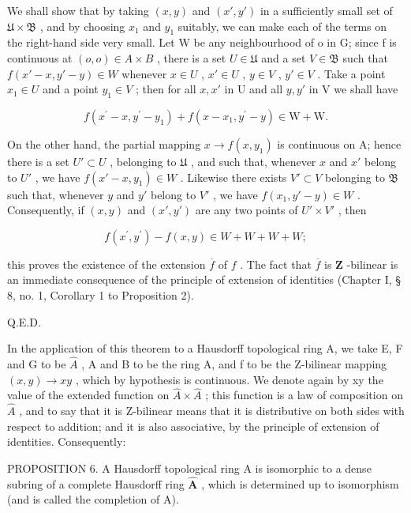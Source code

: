 We shall show that by taking \((x, y)\) and \((x', y')\) in a sufficiently small set of \(\mathfrak{U} \times \mathfrak{B}\) , and by choosing \(x_{1}\) and \(y_{1}\) suitably, we can make each of the terms on the right-hand side very small. Let W be any neighbourhood of o in G; since f is continuous at \((o, o) \in A \times B\) , there is a set \(U \in \mathfrak{U}\) and a set \(V \in \mathfrak{B}\) such that \(f(x' - x, y' - y) \in W\) whenever \(x \in U\) , \(x' \in U\) , \(y \in V\) , \(y' \in V\) . Take a point \(x_{1} \in U\) and a point \(y_{1} \in V\) ; then for all \(x, x'\) in U and all \(y, y'\) in V we shall have

\[
f \left(x ^ {\prime} - x, y ^ {\prime} - y _ {1}\right) + f \left(x - x _ {1}, y ^ {\prime} - y\right) \in \mathrm{W} + \mathrm{W}.
\]

On the other hand, the partial mapping \(x \to f(x, y_1)\) is continuous on A; hence there is a set \(U' \subset U\) , belonging to \(\mathfrak{U}\) , and such that, whenever \(x\) and \(x'\) belong to \(U'\) , we have \(f(x' - x, y_1) \in W\) . Likewise there exists \(V' \subset V\) belonging to \(\mathfrak{B}\) such that, whenever \(y\) and \(y'\) belong to \(V'\) , we have \(f(x_1, y' - y) \in W\) . Consequently, if \((x, y)\) and \((x', y')\) are any two points of \(U' \times V'\) , then

\[
f \left(x ^ {\prime}, y ^ {\prime}\right) - f (x, y) \in W + W + W + W;
\]

this proves the existence of the extension \(\overline{f}\) of \(f\) . The fact that \(\overline{f}\) is \(\mathbf{Z}\) -bilinear is an immediate consequence of the principle of extension of identities (Chapter I, § 8, no. 1, Corollary 1 to Proposition 2).

Q.E.D.

In the application of this theorem to a Hausdorff topological ring A, we take E, F and G to be \(\hat{A}\) , A and B to be the ring A, and f to be the Z-bilinear mapping \((x, y) \to xy\) , which by hypothesis is continuous. We denote again by xy the value of the extended function on \(\hat{A} \times \hat{A}\) ; this function is a law of composition on \(\hat{A}\) , and to say that it is Z-bilinear means that it is distributive on both sides with respect to addition; and it is also associative, by the principle of extension of identities. Consequently:

PROPOSITION 6. A Hausdorff topological ring A is isomorphic to a dense subring of a complete Hausdorff ring \(\hat{\mathbf{A}}\) , which is determined up to isomorphism (and is called the completion of A).

